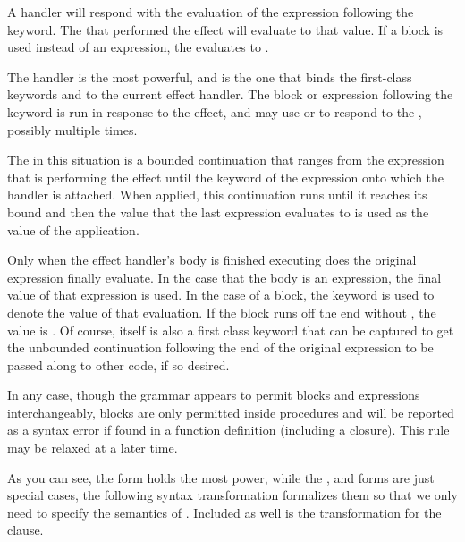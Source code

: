 A  handler will respond with the evaluation of the expression following
the keyword. The  that performed the effect will evaluate to that value.
If a block is used instead of an expression, the  evaluates to .

The  handler is the most powerful, and is the one that binds the
first-class keywords  and  to the current effect handler.
The block or expression following the  keyword is run in response to
the effect, and may use  or  to respond to the ,
possibly multiple times.

The  in this situation is a bounded continuation that ranges from the
 expression that is performing the effect until the  keyword
of the expression onto which the handler is attached. When applied, this continuation
runs until it reaches its bound and then the value that the last expression evaluates
to is used as the value of the  application.

Only when the effect handler's body is finished executing does the original
expression finally evaluate. In the case that the body is an expression, the
final value of that expression is used. In the case of a block, the 
keyword is used to denote the value of that evaluation. If the block runs off
the end without , the value is . Of course,  itself
is also a first class keyword that can be captured to get the unbounded continuation
following the end of the original expression to be passed along to other code, if
so desired.

In any case, though the grammar appears to permit blocks and expressions interchangeably,
blocks are only permitted inside procedures and will be reported as a syntax error if found
in a function definition (including a  closure). This rule may be relaxed at a later
time.

As you can see, the  form holds the most power, while the , 
and  forms are just special cases, the following syntax transformation
formalizes them so that we only need to specify the semantics of .
Included as well is the transformation for the  clause.


